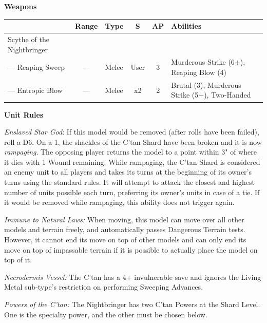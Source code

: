 \begin{minipage}[t]{0.72\textwidth}
	\vspace*{2em}
	\textbf{Weapons}
	
	\begin{tabular}{L{90 pt} c C{40pt} *{2}{c} >{\raggedright\arraybackslash}p{130pt}}
		& Range & Type & S & AP & Abilities \\
		\hline
		Scythe of the Nightbringer & & & & & \\
		— Reaping Sweep & — & Melee & User & 3 & Murderous Strike (6+), Reaping Blow (4) \\
		— Entropic Blow & — & Melee & x2 & 2 & Brutal (3), Murderous Strike (5+), Two-Handed \\
	\end{tabular}
	
	\vspace*{2em}
	\textbf{Unit Rules}
		
	\textit{Enslaved Star God}: If this model would be removed (after  rolls have been failed), roll a D6. On a 1, the shackles of the C'tan Shard have been broken and it is now \textit{rampaging}. The opposing player returns the model to a point within 3" of where it dies with 1 Wound remaining. While rampaging, the C'tan Shard is considered an enemy unit to all players and takes its turns at the beginning of its owner's turns using the standard rules. It will attempt to attack the closest and highest number of units possible each turn, preferring its owner's units in case of a tie. If it would be removed while rampaging, this ability does not trigger again.
	
	\textit{Immune to Natural Laws:} When moving, this model can move over all other models and terrain freely, and automatically passes Dangerous Terrain tests. However, it cannot end its move on top of other models and can only end its move on top of impassable terrain if it is possible to actually place the model on top of it.
	
	\textit{Necrodermis Vessel:} The C'tan has a 4+ invulnerable save and ignores the Living Metal sub-type's restriction on performing Sweeping Advances.
	
	\textit{Powers of the C'tan:} The Nightbringer has two C'tan Powers at the Shard Level. One is the  specialty power, and the other must be chosen below.
	

\end{minipage}
